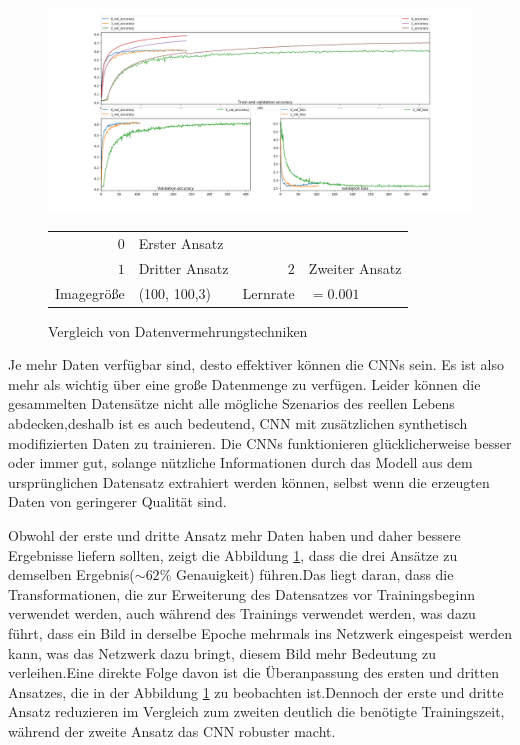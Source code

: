 \documentclass[12pt,a4paper]{scrartcl}
\numberwithin{equation}{section}
\begin{document}
\begin{figure}[h]
	\centering
	\includegraphics[width=\textwidth]{DataAugmentation.png}
	\begin{center}
		\begin{tabular}{r@{: }l r@{: }l}
			$ 0 $& Erster Ansatz	& &	 \\
			$ 1 $ & Dritter Ansatz &	$ 2 $ & Zweiter Ansatz\\
			Imagegröße & (100, 100,3) &  Lernrate & $ =0.001 $
		\end{tabular}
		
	\end{center}
	\caption{ Vergleich von Datenvermehrungstechniken}
	\label{fig:DataAugmentation}
\end{figure}


Je mehr Daten verfügbar sind, desto effektiver können die \acsp{CNN} sein. Es ist also mehr als wichtig über eine große Datenmenge zu verfügen. Leider können die gesammelten Datensätze nicht alle mögliche Szenarios des reellen Lebens abdecken,deshalb ist es auch bedeutend, \ac{CNN}  mit zusätzlichen synthetisch modifizierten Daten zu trainieren. Die \acsp{CNN} funktionieren glücklicherweise besser oder immer gut, solange nützliche Informationen durch das Modell aus dem ursprünglichen Datensatz extrahiert werden können, selbst wenn die erzeugten Daten von geringerer Qualität sind.

Obwohl der erste und dritte Ansatz mehr Daten haben und daher bessere Ergebnisse liefern sollten, zeigt die Abbildung \ref{fig:DataAugmentation}, dass die drei Ansätze zu demselben Ergebnis($ \sim 62\% $ Genauigkeit) führen.Das liegt daran, dass die Transformationen, die zur Erweiterung des Datensatzes vor Trainingsbeginn verwendet werden, auch während des Trainings verwendet werden, was dazu führt, dass ein Bild in derselbe Epoche mehrmals ins Netzwerk eingespeist werden kann, was das Netzwerk dazu bringt, diesem Bild mehr Bedeutung zu verleihen.Eine direkte Folge davon ist die Überanpassung des ersten und dritten Ansatzes, die in der Abbildung \ref{fig:DataAugmentation} zu beobachten ist.Dennoch der erste und dritte Ansatz reduzieren im Vergleich zum zweiten deutlich die benötigte Trainingszeit, während der zweite Ansatz das CNN robuster macht.
\end{document}
